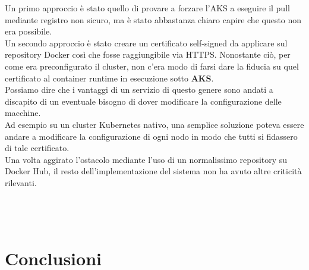 \documentclass[a4paper,12pt]{report}
\begin{document}
\begin{itemize}
Un primo approccio è stato quello di provare a forzare l'AKS a eseguire il pull mediante registro non sicuro, ma è stato abbastanza chiaro capire che questo non era possibile.\\
Un secondo approccio è stato creare un certificato self-signed da applicare sul repository Docker così che fosse raggiungibile via HTTPS. Nonostante ciò, per come era preconfigurato il cluster, non c'era modo di farsi dare la fiducia su quel certificato al container runtime in esecuzione sotto \textbf{AKS}.\\
Possiamo dire che i vantaggi di un servizio di questo genere sono andati a discapito di un eventuale bisogno di dover modificare la configurazione delle macchine.\\
Ad esempio su un cluster Kubernetes nativo, una semplice soluzione poteva essere andare a modificare la configurazione di ogni nodo in modo che tutti si fidassero di tale certificato.\\
Una volta aggirato l'ostacolo mediante l'uso di un normalissimo repository su Docker Hub, il resto dell'implementazione del sistema non ha avuto altre criticità rilevanti.\\ \\ \\ \\
\end{itemize}
\chapter{Conclusioni}
\end{document}
